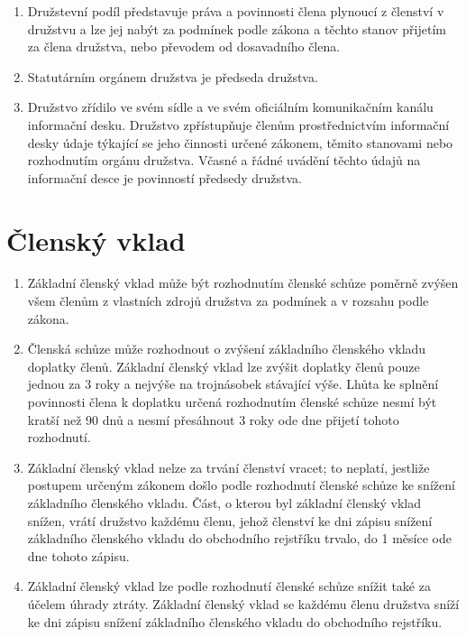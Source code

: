 \begin{enumerate}
    \item Družstevní podíl představuje práva a povinnosti člena plynoucí z členství v družstvu a lze jej nabýt za podmínek podle zákona a těchto stanov přijetím za člena družstva, nebo převodem od dosavadního člena.
    \item Statutárním orgánem družstva je předseda družstva.
    \item Družstvo zřídilo ve svém sídle a ve svém oficiálním komunikačním kanálu informační desku. Družstvo zpřístupňuje členům prostřednictvím informační desky údaje týkající se jeho činnosti určené zákonem, těmito stanovami nebo rozhodnutím orgánu družstva. Včasné a řádné uvádění těchto údajů na informační desce je povinností předsedy družstva.
\end{enumerate}
\section{Členský vklad}
\begin{enumerate}
    \item Základní členský vklad může být rozhodnutím členské schůze poměrně zvýšen všem členům z vlastních zdrojů družstva za podmínek a v rozsahu podle zákona.
    \item Členská schůze může rozhodnout o zvýšení základního členského vkladu doplatky členů. Základní členský vklad lze zvýšit doplatky členů pouze jednou za 3 roky a nejvýše na trojnásobek stávající výše. Lhůta ke splnění povinnosti člena k doplatku určená rozhodnutím členské schůze nesmí být kratší než 90 dnů a nesmí přesáhnout 3 roky ode dne přijetí tohoto rozhodnutí.
    \item Základní členský vklad nelze za trvání členství vracet; to neplatí, jestliže postupem určeným zákonem došlo podle rozhodnutí členské schůze ke snížení základního členského vkladu. Část, o kterou byl základní členský vklad snížen, vrátí družstvo každému členu, jehož členství ke dni zápisu snížení základního členského vkladu do obchodního rejstříku trvalo, do 1 měsíce ode dne tohoto zápisu.
    \item Základní členský vklad lze podle rozhodnutí členské schůze snížit také za účelem úhrady ztráty. Základní členský vklad se každému členu družstva sníží ke dni zápisu snížení základního členského vkladu do obchodního rejstříku.
\end{enumerate}

